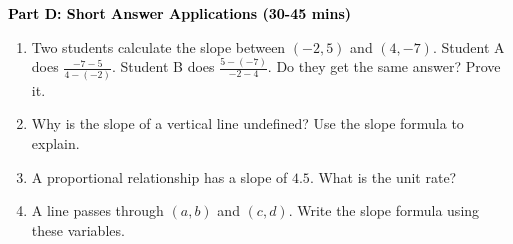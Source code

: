 \documentclass[12pt, letterpaper, fleqn]{article}
\begin{document}
\newpage

\begin{tcolorbox}[colback=customteal!20]
\large\textcolor{black}{\textbf{Part D: Short Answer Applications (30-45 mins)}}
\end{tcolorbox}

\vspace{3mm}

\begin{enumerate}[itemsep=4.2cm, leftmargin=0.6cm, resume]
\item Two students calculate the slope between $(-2, 5)$ and $(4, -7)$. Student A does $\frac{-7 - 5}{4 - (-2)}$. Student B does $\frac{5 - (-7)}{-2 - 4}$. Do they get the same answer? Prove it.
\item Why is the slope of a vertical line undefined? Use the slope formula to explain.
\item A proportional relationship has a slope of $4.5$. What is the unit rate?
\item A line passes through $(a, b)$ and $(c, d)$. Write the slope formula using these variables.
\end{enumerate}
\end{document}
